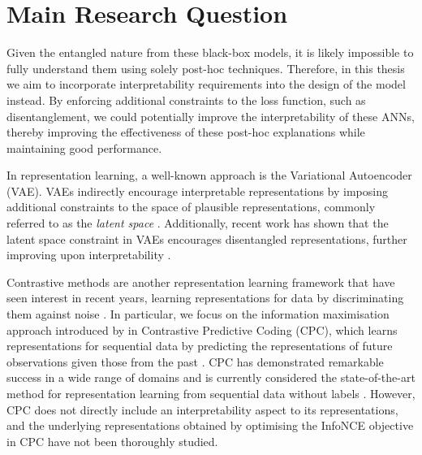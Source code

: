 \section{Main Research Question}
Given the entangled nature from these black-box models, it is likely impossible to fully understand them using solely post-hoc techniques. Therefore, in this thesis we aim to incorporate interpretability requirements into the design of the model instead. By enforcing additional constraints to the loss function, such as disentanglement, we could potentially improve the interpretability of these ANNs, thereby improving the effectiveness of these post-hoc explanations while maintaining good performance.

In representation learning, a well-known approach is the Variational Autoencoder (VAE). VAEs indirectly encourage interpretable representations by imposing additional constraints to the space of plausible representations, commonly referred to as the \textit{latent space} \citep{kingmaAutoEncodingVariationalBayes2022}. Additionally, recent work has shown that the latent space constraint in VAEs encourages disentangled representations, further improving upon interpretability \citep{burgessUnderstandingDisentanglingBeta2018, sikkaCloserLookDisentangling2019, higginsBetaVAELearningBasic2022}.

Contrastive methods are another representation learning framework that have seen interest in recent years, learning representations for data by discriminating them against noise \citep{chenSimpleFrameworkContrastive2020}. In particular, we focus on the information maximisation approach introduced by \cite{oordRepresentationLearningContrastive2019} in Contrastive Predictive Coding (CPC), which learns representations for sequential data by predicting the representations of future observations given those from the past \cite{henaffDataEfficientImageRecognition2020}. CPC has demonstrated remarkable success in a wide range of domains and is currently considered the state-of-the-art method for representation learning from sequential data without labels \citep{stackeEvaluationContrastivePredictive2020, dehaanContrastivePredictiveCoding2021, luSemiSupervisedHistologyClassification2019, bhatiSegmentalContrastivePredictive2021, deldariTimeSeriesChange2021, henaffDataEfficientImageRecognition2020}. However, CPC does not directly include an interpretability aspect to its representations, and the underlying representations obtained by optimising the InfoNCE objective in CPC have not been thoroughly studied.


